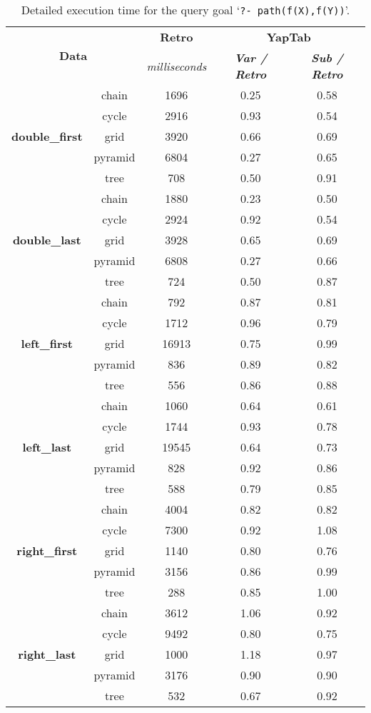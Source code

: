 \begin{table}[ht]
\centering
\footnotesize{
  \begin{tabular}{cc|c|cc}
   \hline
    \hline
    \multicolumn{2}{c|}{\multirow{2}{*}{\small{\textbf{Data}}}} & \textbf{\small{Retro}} & \multicolumn{2}{c}{\small{\textbf{YapTab}}} \\
     \multicolumn{2}{c|}{} & \scriptsize{\textit{milliseconds}} & \textbf{\textit{\scriptsize{Var / Retro}}} & \textbf{\textit{\scriptsize{Sub / Retro}}} \\
   \hline
   \hline

\multirow{5}{*}{\textbf{double\_first}} &  chain &  1696 &  0.25 & 0.58 \\
&  cycle &  2916 &  0.93 & 0.54 \\
&  grid &  3920 &  0.66 & 0.69 \\
&  pyramid &  6804 &  0.27 & 0.65 \\
&  tree &  708 &  0.50 & 0.91 \\
\hline
\multirow{5}{*}{\textbf{double\_last}} &  chain &  1880 &  0.23 & 0.50 \\
&  cycle &  2924 &  0.92 & 0.54 \\
&  grid &  3928 &  0.65 & 0.69 \\
&  pyramid &  6808 &  0.27 & 0.66 \\
&  tree &  724 &  0.50 & 0.87 \\
\hline
\multirow{5}{*}{\textbf{left\_first}} &  chain &  792 &  0.87 & 0.81 \\
&  cycle &  1712 &  0.96 & 0.79 \\
&  grid &  16913 &  0.75 & 0.99 \\
&  pyramid &  836 &  0.89 & 0.82 \\
&  tree &  556 &  0.86 & 0.88 \\
\hline
\multirow{5}{*}{\textbf{left\_last}} &  chain &  1060 &  0.64 & 0.61 \\
&  cycle &  1744 &  0.93 & 0.78 \\
&  grid &  19545 &  0.64 & 0.73 \\
&  pyramid &  828 &  0.92 & 0.86 \\
&  tree &  588 &  0.79 & 0.85 \\
\hline
\multirow{5}{*}{\textbf{right\_first}} &  chain &  4004 &  0.82 & 0.82 \\
&  cycle &  7300 &  0.92 & 1.08 \\
&  grid &  1140 &  0.80 & 0.76 \\
&  pyramid &  3156 &  0.86 & 0.99 \\
&  tree &  288 &  0.85 & 1.00 \\
\hline
\multirow{5}{*}{\textbf{right\_last}} &  chain &  3612 &  1.06 & 0.92 \\
&  cycle &  9492 &  0.80 & 0.75 \\
&  grid &  1000 &  1.18 & 0.97 \\
&  pyramid &  3176 &  0.90 & 0.90 \\
&  tree &  532 &  0.67 & 0.92 \\
\hline
\hline
\end{tabular}
}
\caption{Detailed execution time for the query goal `\texttt{?-~path(f(X),f(Y))}'.}
\label{tbl:results_detail_stst}
\end{table}